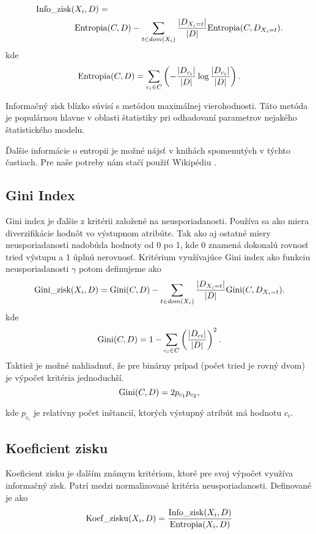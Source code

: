 \begin{align}
\mbox{Info\_zisk}(& X_{i},D) = \nonumber \\
& \mbox{Entropia}(C,D) -
\sum_{t \in dom(X_{i})}^{}
\dfrac{\lvert D_{X_{i} = t}\lvert}{\lvert D \lvert} 
\mbox{Entropia}(C,D_{X_{i} = t}). \label{kap1:2.5:2.5.2:InfoGainDef} 
\end{align}
kde
\begin{equation}
\mbox{Entropia}(C,D) = \sum_{c_{i} \in C}^{} \left( -
\dfrac{\lvert D_{c_{i}}\lvert}{\lvert D \lvert} \log
\dfrac{\lvert D_{c_{i}}\lvert}{\lvert D \lvert}\right). 
\end{equation}

Informačný zisk blízko súvisí s metódou maximálnej vierohodnosti. Táto metóda je populárnou hlavne v oblasti štatistiky pri odhadovaní parametrov nejakého štatistického modelu.

Ďalšie informácie o entropii je možné nájsť v knihách spomenutých v týchto častiach. Pre naše potreby nám stačí použiť Wikipédiu \cite{wiki-Entropy}.
\subsection{Gini Index}\label{kap1:2.5:2.5.3:GiniIndex}
Gini index je ďalšie z kritérii založené na neusporiadanosti. Používa sa ako miera diverzifikácie hodnôt vo výstupnom atribúte. Tak ako aj ostatné miery neusporiadanosti nadobúda hodnoty od 0 po 1, kde 0 znamená dokonalú rovnosť tried výstupu a 1 úplnú nerovnosť. Kritérium využívajúce Gini index ako funkciu neusporiadanosti $\gamma$ potom definujeme ako
\begin{align}
\mbox{Gini\_zisk}(X_{i},D) = \mbox{Gini}(C,D) -
\sum_{t \in dom(X_{i})}^{}
\dfrac{\lvert D_{X_{i} = t}\lvert}{\lvert D \lvert} 
\mbox{Gini}(C,D_{X_{i} = t}). \label{kap1:2.5:2.5.3:GiniIndexDef}
\end{align}
kde
\begin{equation}
\mbox{Gini}(C,D) = 1 - \sum_{c_{i} \in C}^{} 
\left(
\dfrac{\lvert D_{c{i}}\lvert}{\lvert D \lvert} 
\right) ^ 2. 
\end{equation}
Taktiež je možné nahliadnuť, že pre binárny prípad (počet tried je rovný dvom) je výpočet kritéria jednoduchší.
\begin{equation}
\mbox{Gini}(C,D) = 2p_{c_{1}}p_{c_{2}}, 
\end{equation}

kde $p_{c_{i}}$ je relatívny počet inštancií, ktorých výstupný atribút má hodnotu $c_{i}$.

\subsection{Koeficient zisku}\label{kap1:2.5:2.5.4:GainRatio} 
Koeficient zisku je ďalším známym kritériom, ktoré pre svoj výpočet využíva informačný zisk. Patrí medzi normalizované kritéria neusporiadanosti. Definované je ako
\begin{align}
\mbox{Koef\_zisku}(X_{i},D) =
\dfrac{\mbox{Info\_zisk}(X_{i},D)}{\mbox{Entropia}(X_{i},D)} \label{kap1:2.5:2.5.4:GainRatioDef} 
\end{align}

